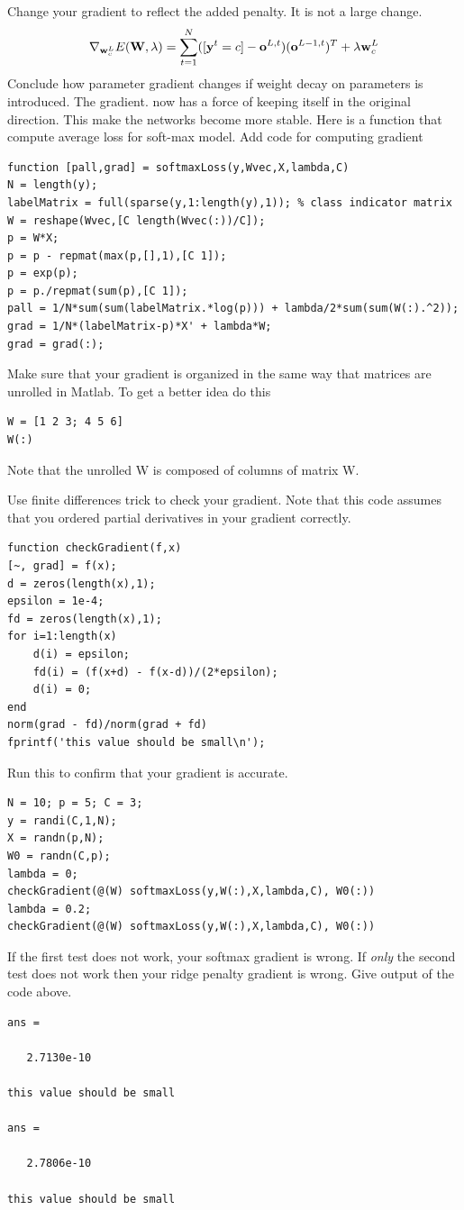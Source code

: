 \documentclass{article}
\begin{document}
\newproblem{1pt}Change your gradient to reflect the added penalty. It is not a large change.
\[
\nabla_{\mathbf{w}^L_c} E(\mathbf{W},\lambda) =  
\sum_{t=1}^N ([\mathbf{y}^t=c]-\mathbf{o}^{L,t})(\mathbf{o}^{L-1,t})^T
+\lambda \mathbf{w}^L_c
\]
Conclude how parameter gradient changes if weight decay on parameters is introduced.
The gradient. now has a force of keeping itself in the original direction.
This make the networks become more stable.
\newproblem{1pt}
Here is a function that compute average loss for soft-max model. Add code
for computing gradient
\begin{verbatim}
function [pall,grad] = softmaxLoss(y,Wvec,X,lambda,C)
N = length(y);
labelMatrix = full(sparse(y,1:length(y),1)); % class indicator matrix
W = reshape(Wvec,[C length(Wvec(:))/C]);
p = W*X;
p = p - repmat(max(p,[],1),[C 1]);
p = exp(p);
p = p./repmat(sum(p),[C 1]);
pall = 1/N*sum(sum(labelMatrix.*log(p))) + lambda/2*sum(sum(W(:).^2));
grad = 1/N*(labelMatrix-p)*X' + lambda*W;
grad = grad(:);

\end{verbatim}
Make sure that your gradient is organized in the same way that matrices are unrolled in Matlab.
To get a better idea do this
\begin{verbatim}
W = [1 2 3; 4 5 6]
W(:)
\end{verbatim}
Note that the unrolled W is composed of columns of matrix W.

\newproblem{1pt} Use finite differences trick to check your gradient.
Note that this code assumes that you ordered partial derivatives in your gradient correctly.

\begin{verbatim}
function checkGradient(f,x)
[~, grad] = f(x);
d = zeros(length(x),1);
epsilon = 1e-4;
fd = zeros(length(x),1);
for i=1:length(x)
    d(i) = epsilon;
    fd(i) = (f(x+d) - f(x-d))/(2*epsilon);
    d(i) = 0;
end
norm(grad - fd)/norm(grad + fd)
fprintf('this value should be small\n');
\end{verbatim}
Run this to confirm that your gradient is accurate.
\begin{verbatim}
N = 10; p = 5; C = 3;
y = randi(C,1,N);
X = randn(p,N);
W0 = randn(C,p);
lambda = 0;
checkGradient(@(W) softmaxLoss(y,W(:),X,lambda,C), W0(:))
lambda = 0.2;
checkGradient(@(W) softmaxLoss(y,W(:),X,lambda,C), W0(:))
\end{verbatim}
If the first test does not work, your softmax gradient is wrong.
If {\em only} the second test does not work then your ridge penalty gradient is wrong.
Give output of the code above.
\begin{verbatim}
ans =

   2.7130e-10

this value should be small

ans =

   2.7806e-10

this value should be small
\end{verbatim}
\end{document}
